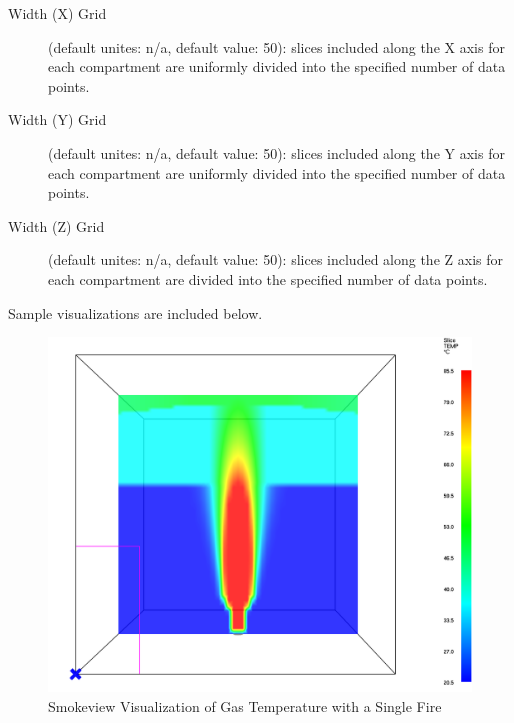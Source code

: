 \begin{description}
\item[Width (X) Grid] (default unites: n/a, default value: 50): slices included along the X axis for each compartment are uniformly divided into the specified number of data points.

\item[Width (Y) Grid] (default unites: n/a, default value: 50): slices included along the Y axis for each compartment are uniformly divided into the specified number of data points.

\item[Width (Z) Grid] (default unites: n/a, default value: 50): slices included along the Z axis for each compartment are divided into the specified number of data points.
\end{description}

Sample visualizations are included below.

\begin{figure}[h!]
\begin{center}
\includegraphics[width=6.5in]{FIGURES/SMV_Temperature}
\caption{Smokeview Visualization of Gas Temperature with a Single Fire}
\end{center}
\end{figure}

